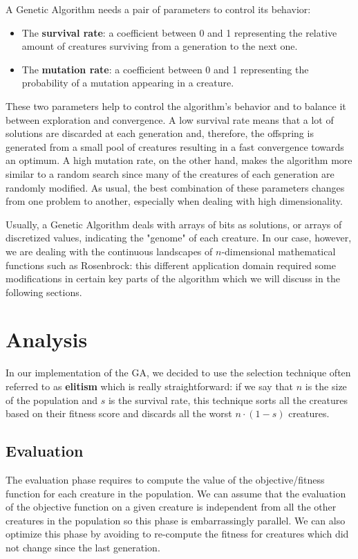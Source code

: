 \documentclass[12pt,a4paper,oneside]{article}
\begin{document}
	A Genetic Algorithm needs a pair of parameters to control its behavior:
	\begin{itemize}
		\item The \textbf{survival rate}: a coefficient between 0 and 1 representing the relative amount of creatures surviving from a generation to the next one.
		\item The \textbf{mutation rate}: a coefficient between 0 and 1 representing the probability of a mutation appearing in a creature.
	\end{itemize}

	These two parameters help to control the algorithm's behavior and to balance it between exploration and convergence.
	A low survival rate means that a lot of solutions are discarded at each generation and, therefore, the offspring is generated from a small pool of creatures resulting in a fast convergence towards an optimum.
	A high mutation rate, on the other hand, makes the algorithm more similar to a random search since many of the creatures of each generation are randomly modified.
	As usual, the best combination of these parameters changes from one problem to another, especially when dealing with high dimensionality.

	Usually, a Genetic Algorithm deals with arrays of bits as solutions, or arrays of discretized values, indicating the "genome" of each creature. In our case, however, we are dealing with the continuous landscapes of $n$-dimensional mathematical functions such as Rosenbrock: this different application domain required some modifications in certain key parts of the algorithm which we will discuss in the following sections.

	\clearpage
	\section{Analysis}
	In our implementation of the GA, we decided to use the selection technique often referred to as \textbf{elitism} which is really straightforward: if we say that $n$ is the size of the population and $s$ is the survival rate, this technique sorts all the creatures based on their fitness score and discards all the worst $n \cdot (1 - s)$ creatures.

	\subsection{Evaluation}
	\label{analysis:eval}
	The evaluation phase requires to compute the value of the objective/fitness function for each creature in the population. We can assume that the evaluation of the objective function on a given creature is independent from all the other creatures in the population so this phase is embarrassingly parallel.
	We can also optimize this phase by avoiding to re-compute the fitness for creatures which did not change since the last generation.
\end{document}
